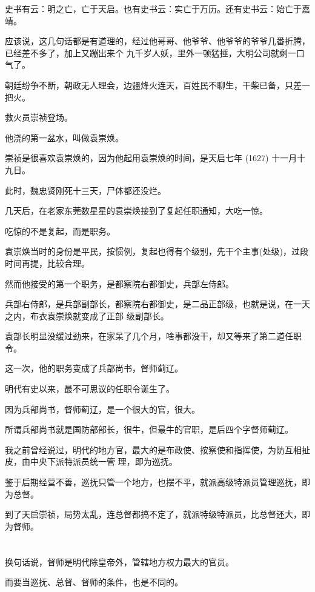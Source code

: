 \documentclass[11pt,a4paper,onecolumn]{article}
\begin{document}
史书有云：明之亡，亡于天启。也有史书云：实亡于万历。还有史书云：始亡于嘉靖。

应该说，这几句话都是有道理的，经过他哥哥、他爷爷、他爷爷的爷爷几番折腾，已经差不多了，加上又蹦出来个
九千岁人妖，里外一顿猛捶，大明公司就剩一口气了。

朝廷纷争不断，朝政无人理会，边疆烽火连天，百姓民不聊生，干柴已备，只差一把火。

救火员崇祯登场。

他浇的第一盆水，叫做袁崇焕。

崇祯是很喜欢袁崇焕的，因为他起用袁崇焕的时间，是天启七年 (1627) 十一月十九日。

此时，魏忠贤刚死十三天，尸体都还没烂。

几天后，在老家东莞数星星的袁崇焕接到了复起任职通知，大吃一惊。

吃惊的不是复起，而是职务。

袁崇焕当时的身份是平民，按惯例，复起也得有个级别，先干个主事(处级)，过段时间再提，比较合理。

然而他接受的第一个职务，是都察院右都御史，兵部左侍郎。

兵部右侍郎，是兵部副部长，都察院右都御史，是二品正部级，也就是说，在一天之内，布衣袁崇焕就变成了正部
级副部长。

袁部长明显没缓过劲来，在家呆了几个月，啥事都没干，却又等来了第二道任职令。

这一次，他的职务变成了兵部尚书，督师蓟辽。

明代有史以来，最不可思议的任职令诞生了。

因为兵部尚书，督师蓟辽，是一个很大的官，很大。

所谓兵部尚书就是国防部部长，很牛，但最牛的官职，是后四个字\myrule 督师蓟辽。

我之前曾经说过，明代的地方官，最大的是布政使、按察使和指挥使，为防互相扯皮，由中央下派特派员统一管
理，即为巡抚。

鉴于后期经营不善，巡抚只管一个地方，也摆不平，就派高级特派员管理巡抚，即为总督。

到了天启崇祯，局势太乱，连总督都搞不定了，就派特级特派员，比总督还大，即为督师。

\section[\thesection]{}

换句话说，督师是明代除皇帝外，管辖地方权力最大的官员。

而要当巡抚、总督、督师的条件，也是不同的。
\end{document}
